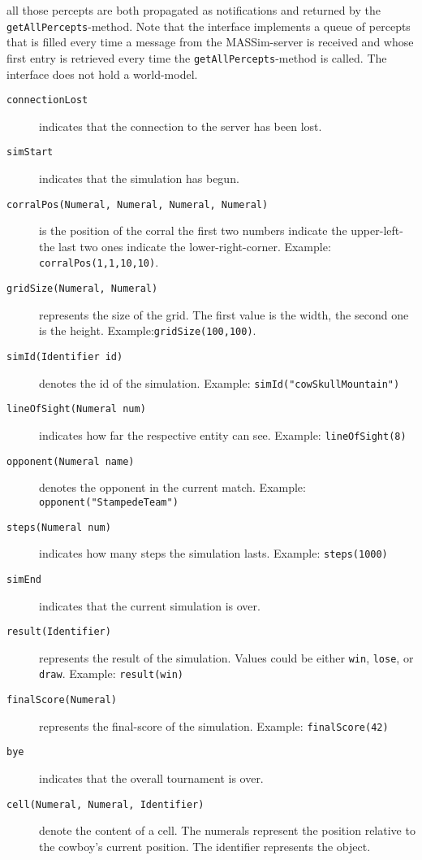 \documentclass[a4]{article}
\begin{document}
 all those percepts are both propagated as notifications and returned by the
\texttt{getAllPercepts}-method. Note that the interface implements a queue of percepts that is filled every time
a message from the MASSim-server is received and whose first entry is retrieved every time the \texttt{getAllPercepts}-method is called. The interface does not hold a world-model.
\begin{description}
\item[\texttt{connectionLost}] indicates that the connection to the server has been lost. 
\item[\texttt{simStart}] indicates that the simulation has begun.
\item[\texttt{corralPos(Numeral, Numeral, Numeral, Numeral)}] is the position of the corral the first two numbers indicate the upper-left- 
the last two ones indicate the lower-right-corner. Example: \texttt{corralPos(1,1,10,10)}.
\item[\texttt{gridSize(Numeral, Numeral)}] represents the size of the grid. The first value is the width, the second one is 
the height. Example:\texttt{gridSize(100,100)}.
\item[\texttt{simId(Identifier id)}] denotes the id of the simulation. Example: \texttt{simId("cowSkullMountain")}
\item[\texttt{lineOfSight(Numeral num)}] indicates how far the respective entity can see. 
Example: \texttt{lineOfSight(8)}
\item[\texttt{opponent(Numeral name)}] denotes the opponent in the current match. 
Example: \texttt{opponent("StampedeTeam")}
\item[\texttt{steps(Numeral num)}] indicates how many steps the simulation lasts. Example: \texttt{steps(1000)}
\item[\texttt{simEnd}] indicates that the current simulation is over.
\item[\texttt{result(Identifier)}] represents the result of the simulation. Values could be either \texttt{win},  
\texttt{lose}, or  \texttt{draw}. Example: \texttt{result(win)}
\item[\texttt{finalScore(Numeral)}] represents the final-score of the simulation. Example: \texttt{finalScore(42)}
\item[\texttt{bye}] indicates that the overall tournament is over.
\item[\texttt{cell(Numeral, Numeral, Identifier)}] denote the content of a cell. The numerals represent the position 
relative to the cowboy's current position. The identifier represents the object. 

\end{description}
\end{document}
